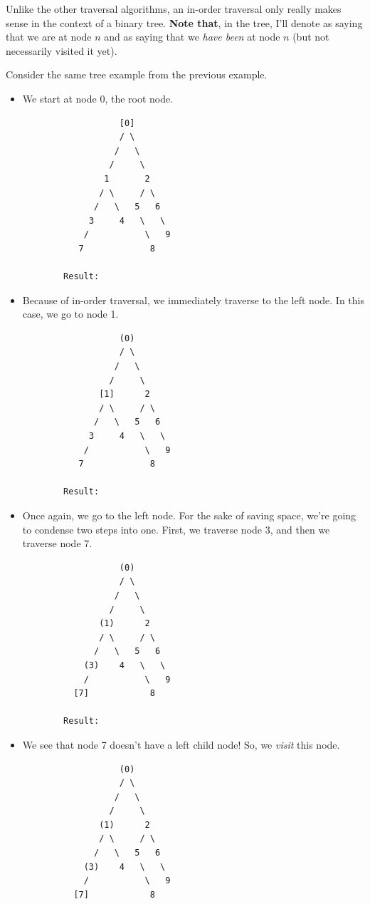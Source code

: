 \documentclass[letterpaper]{article}
\begin{document}
Unlike the other traversal algorithms, an in-order traversal only really makes sense in the context of a binary tree. \textbf{Note that}, in the tree, I'll denote \code{[n]} as saying that we are at node $n$ and  as saying that we \emph{have been} at node $n$ (but not necessarily visited it yet). 

\bigskip 

Consider the same tree example from the previous example. 
\begin{itemize}
    \item We start at node 0, the root node.
    \begin{verbatim}
                   [0]
                   / \
                  /   \
                 /     \
                1       2 
               / \     / \ 
              /   \   5   6
             3     4   \   \ 
            /           \   9
           7             8

        Result: 
    \end{verbatim}

    \item Because of in-order traversal, we immediately traverse to the left node. In this case, we go to node 1.  
    \begin{verbatim}
                   (0)
                   / \
                  /   \
                 /     \
               [1]      2 
               / \     / \ 
              /   \   5   6
             3     4   \   \ 
            /           \   9
           7             8

        Result: 
    \end{verbatim}

    \item Once again, we go to the left node. For the sake of saving space, we're going to condense two steps into one. First, we traverse node 3, and then we traverse node 7. 
    \begin{verbatim}
                   (0)
                   / \
                  /   \
                 /     \
               (1)      2 
               / \     / \ 
              /   \   5   6
            (3)    4   \   \ 
            /           \   9
          [7]            8

        Result: 
    \end{verbatim}

    \item We see that node 7 doesn't have a left child node! So, we \emph{visit} this node. 
    \begin{verbatim}
                   (0)
                   / \
                  /   \
                 /     \
               (1)      2 
               / \     / \ 
              /   \   5   6
            (3)    4   \   \ 
            /           \   9
          [7]            8


\end{verbatim}
\end{itemize}
\end{document}
